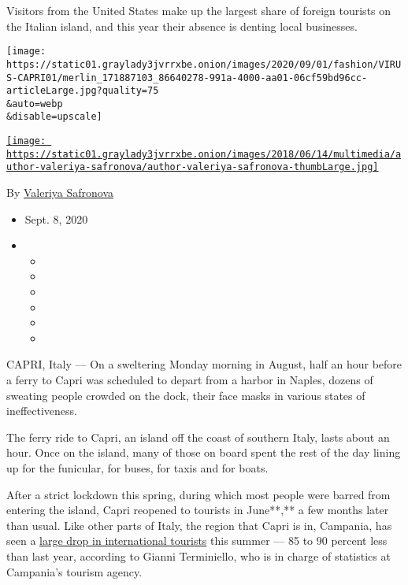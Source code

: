 Visitors from the United States make up the largest share of foreign
tourists on the Italian island, and this year their absence is denting
local businesses.

\texttt{[image: https://static01.graylady3jvrrxbe.onion/images/2020/09/01/fashion/VIRUS-CAPRI01/merlin\_171887103\_86640278-991a-4000-aa01-06cf59bd96cc-articleLarge.jpg?quality=75\\\&auto=webp\\\&disable=upscale]}

\href{https://www.nytimes3xbfgragh.onion/by/valeriya-safronova}{\texttt{[image: https://static01.graylady3jvrrxbe.onion/images/2018/06/14/multimedia/author-valeriya-safronova/author-valeriya-safronova-thumbLarge.jpg]}}

By
\href{https://www.nytimes3xbfgragh.onion/by/valeriya-safronova}{Valeriya
Safronova}

\begin{itemize}
\item
  Sept. 8, 2020
\item
  \begin{itemize}
  \item
  \item
  \item
  \item
  \item
  \item
  \end{itemize}
\end{itemize}

CAPRI, Italy --- On a sweltering Monday morning in August, half an hour
before a ferry to Capri was scheduled to depart from a harbor in Naples,
dozens of sweating people crowded on the dock, their face masks in
various states of ineffectiveness.

The ferry ride to Capri, an island off the coast of southern Italy,
lasts about an hour. Once on the island, many of those on board spent
the rest of the day lining up for the funicular, for buses, for taxis
and for boats.

After a strict lockdown this spring, during which most people were
barred from entering the island, Capri reopened to tourists in June**,**
a few months later than usual. Like other parts of Italy, the region
that Capri is in, Campania, has seen a
\href{https://www.nytimes3xbfgragh.onion/2020/06/10/world/europe/italy-coronavirus-tourism.html}{large
drop in international tourists} this summer --- 85 to 90 percent less
than last year, according to Gianni Terminiello, who is in charge of
statistics at Campania's tourism agency.

